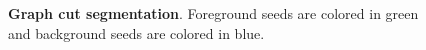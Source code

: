 \begin{figure}
\caption{\textbf{Graph cut segmentation}. Foreground seeds are colored in green and background seeds are colored in blue.}
\end{figure}

